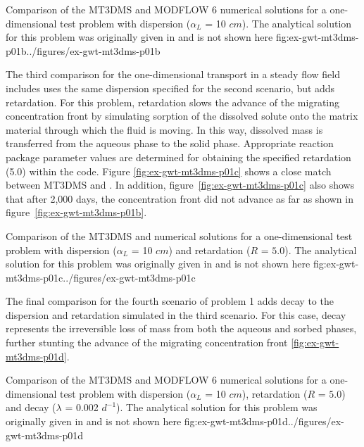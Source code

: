 \begin{StandardFigure}
	{Comparison of the MT3DMS and MODFLOW 6 numerical solutions for a one-dimensional test problem with dispersion ($\alpha_L$ = 10 $cm$).  The analytical solution for this problem was originally given in \cite{vanGenuchtenAlves1982} and is not shown here}
	{fig:ex-gwt-mt3dms-p01b}{../figures/ex-gwt-mt3dms-p01b}
\end{StandardFigure}

The third comparison for the one-dimensional transport in a steady flow field includes uses the same dispersion specified for the second scenario, but adds retardation.  For this problem, retardation slows the advance of the migrating concentration front by simulating sorption of the dissolved solute onto the matrix material through which the fluid is moving. In this way, dissolved mass is transferred from the aqueous phase to the solid phase. Appropriate reaction package parameter values are determined for obtaining the specified retardation (5.0) within the code. Figure \ref{fig:ex-gwt-mt3dms-p01c} shows a close match between MT3DMS and \mf. In addition, figure~\ref{fig:ex-gwt-mt3dms-p01c} also shows that after 2,000 days, the concentration front did not advance as far as shown in figure~\ref{fig:ex-gwt-mt3dms-p01b}.

\begin{StandardFigure}
	{Comparison of the MT3DMS and \mf numerical solutions for a one-dimensional test problem with dispersion ($\alpha_L$ = 10 $cm$) and retardation ($R$ = $5.0$). The analytical solution for this problem was originally given in \cite{vanGenuchtenAlves1982} and is not shown here}
	{fig:ex-gwt-mt3dms-p01c}{../figures/ex-gwt-mt3dms-p01c}
\end{StandardFigure}

The final comparison for the fourth scenario of problem 1 adds decay to the dispersion and retardation simulated in the third scenario. For this case, decay represents the irreversible loss of mass from both the aqueous and sorbed phases, further stunting the advance of the migrating concentration front \ref{fig:ex-gwt-mt3dms-p01d}.  

\begin{StandardFigure}
	{Comparison of the MT3DMS and MODFLOW 6 numerical solutions for a one-dimensional test problem with dispersion ($\alpha_L$ = 10 $cm$), retardation ($R$ = $5.0$) and decay ($\lambda$ = 0.002 $d^{-1}$).  The analytical solution for this problem was originally given in \cite{vanGenuchtenAlves1982} and is not shown here}
	{fig:ex-gwt-mt3dms-p01d}{../figures/ex-gwt-mt3dms-p01d}
\end{StandardFigure}



